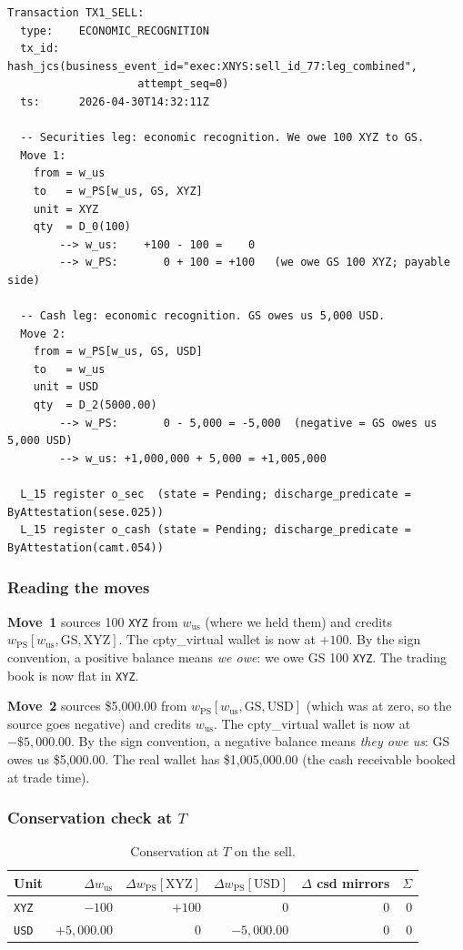 \documentclass[11pt,a4paper]{article}
\begin{document}
\begin{lstlisting}
Transaction TX1_SELL:
  type:    ECONOMIC_RECOGNITION
  tx_id:   hash_jcs(business_event_id="exec:XNYS:sell_id_77:leg_combined",
                    attempt_seq=0)
  ts:      2026-04-30T14:32:11Z

  -- Securities leg: economic recognition. We owe 100 XYZ to GS.
  Move 1:
    from = w_us
    to   = w_PS[w_us, GS, XYZ]
    unit = XYZ
    qty  = D_0(100)
        --> w_us:    +100 - 100 =    0
        --> w_PS:       0 + 100 = +100   (we owe GS 100 XYZ; payable side)

  -- Cash leg: economic recognition. GS owes us 5,000 USD.
  Move 2:
    from = w_PS[w_us, GS, USD]
    to   = w_us
    unit = USD
    qty  = D_2(5000.00)
        --> w_PS:       0 - 5,000 = -5,000  (negative = GS owes us 5,000 USD)
        --> w_us: +1,000,000 + 5,000 = +1,005,000

  L_15 register o_sec  (state = Pending; discharge_predicate = ByAttestation(sese.025))
  L_15 register o_cash (state = Pending; discharge_predicate = ByAttestation(camt.054))
\end{lstlisting}

\subsubsection*{Reading the moves}

\textbf{Move~1} sources 100 \texttt{XYZ} from $w_{\mathrm{us}}$ (where we held them) and credits $w_{\mathrm{PS}}[w_{\mathrm{us}}, \mathrm{GS}, \mathrm{XYZ}]$. The cpty\_virtual wallet is now at $+100$. By the sign convention, a positive balance means \emph{we owe}: we owe GS 100 \texttt{XYZ}. The trading book is now flat in \texttt{XYZ}.

\textbf{Move~2} sources \$5{,}000.00 from $w_{\mathrm{PS}}[w_{\mathrm{us}}, \mathrm{GS}, \mathrm{USD}]$ (which was at zero, so the source goes negative) and credits $w_{\mathrm{us}}$. The cpty\_virtual wallet is now at $-\$5{,}000.00$. By the sign convention, a negative balance means \emph{they owe us}: GS owes us \$5{,}000.00. The real wallet has \$1{,}005{,}000.00 (the cash receivable booked at trade time).

\subsubsection*{Conservation check at $T$}

\begin{table}[h]
\centering
\begin{tabular}{lrrrrr}
\toprule
\textbf{Unit} & $\Delta w_{\mathrm{us}}$ & $\Delta w_{\mathrm{PS}}[\mathrm{XYZ}]$ & $\Delta w_{\mathrm{PS}}[\mathrm{USD}]$ & $\Delta$ csd mirrors & $\Sigma$ \\
\midrule
\texttt{XYZ} & $-100$        & $+100$        & $0$           & $0$ & $0$ \\
\texttt{USD} & $+5{,}000.00$ & $0$           & $-5{,}000.00$ & $0$ & $0$ \\
\bottomrule
\end{tabular}
\caption{Conservation at $T$ on the sell.}
\end{table}
\end{document}
